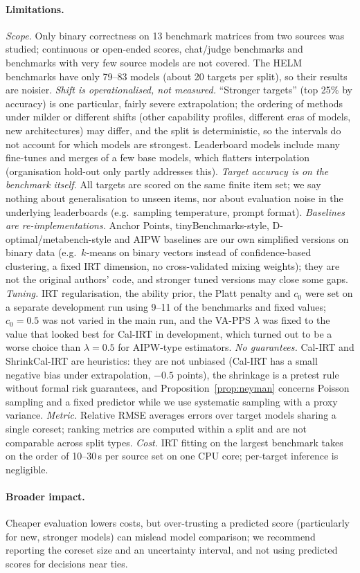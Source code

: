 \paragraph{Limitations.}
\emph{Scope.} Only binary correctness on 13 benchmark matrices from two sources was studied; continuous or open-ended scores, chat/judge benchmarks and benchmarks with very few source models are not covered. The HELM benchmarks have only 79--83 models (about 20 targets per split), so their results are noisier. \emph{Shift is operationalised, not measured.} ``Stronger targets'' (top 25\% by accuracy) is one particular, fairly severe extrapolation; the ordering of methods under milder or different shifts (other capability profiles, different eras of models, new architectures) may differ, and the split is deterministic, so the intervals do not account for which models are strongest. Leaderboard models include many fine-tunes and merges of a few base models, which flatters interpolation (organisation hold-out only partly addresses this). \emph{Target accuracy is on the benchmark itself.} All targets are scored on the same finite item set; we say nothing about generalisation to unseen items, nor about evaluation noise in the underlying leaderboards (e.g.\ sampling temperature, prompt format). \emph{Baselines are re-implementations.} Anchor Points, tinyBenchmarks-style, D-optimal/metabench-style and AIPW baselines are our own simplified versions on binary data (e.g.\ $k$-means on binary vectors instead of confidence-based clustering, a fixed IRT dimension, no cross-validated mixing weights); they are not the original authors' code, and stronger tuned versions may close some gaps. \emph{Tuning.} IRT regularisation, the ability prior, the Platt penalty and $c_0$ were set on a separate development run using 9--11 of the benchmarks and fixed values; $c_0=0.5$ was not varied in the main run, and the VA-PPS $\lambda$ was fixed to the value that looked best for Cal-IRT in development, which turned out to be a worse choice than $\lambda=0.5$ for AIPW-type estimators. \emph{No guarantees.} Cal-IRT and ShrinkCal-IRT are heuristics: they are not unbiased (Cal-IRT has a small negative bias under extrapolation, $-0.5$ points), the shrinkage is a pretest rule without formal risk guarantees, and Proposition~\ref{prop:neyman} concerns Poisson sampling and a fixed predictor while we use systematic sampling with a proxy variance. \emph{Metric.} Relative RMSE averages errors over target models sharing a single coreset; ranking metrics are computed within a split and are not comparable across split types. \emph{Cost.} IRT fitting on the largest benchmark takes on the order of 10--30\,s per source set on one CPU core; per-target inference is negligible.

\paragraph{Broader impact.} Cheaper evaluation lowers costs, but over-trusting a predicted score (particularly for new, stronger models) can mislead model comparison; we recommend reporting the coreset size and an uncertainty interval, and not using predicted scores for decisions near ties.
